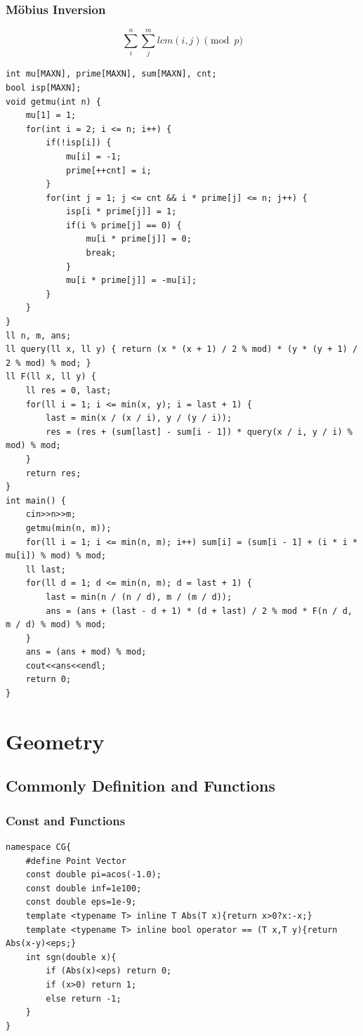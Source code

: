 \documentclass[10pt]{ctexart}
\begin{document}
{\subsubsection{Möbius Inversion}
$$
\sum_i^n \sum_j^m lcm(i,j)\pmod p
$$
\begin{lstlisting}
int mu[MAXN], prime[MAXN], sum[MAXN], cnt;
bool isp[MAXN];
void getmu(int n) {
    mu[1] = 1;
    for(int i = 2; i <= n; i++) {
        if(!isp[i]) {
            mu[i] = -1;
            prime[++cnt] = i;
        }
        for(int j = 1; j <= cnt && i * prime[j] <= n; j++) {
            isp[i * prime[j]] = 1;
            if(i % prime[j] == 0) {
                mu[i * prime[j]] = 0;
                break;
            }
            mu[i * prime[j]] = -mu[i];
        }
    }
}
ll n, m, ans;
ll query(ll x, ll y) { return (x * (x + 1) / 2 % mod) * (y * (y + 1) / 2 % mod) % mod; }
ll F(ll x, ll y) {
    ll res = 0, last;
    for(ll i = 1; i <= min(x, y); i = last + 1) {
        last = min(x / (x / i), y / (y / i));
        res = (res + (sum[last] - sum[i - 1]) * query(x / i, y / i) % mod) % mod;
    }
    return res;
}
int main() {
    cin>>n>>m;
    getmu(min(n, m));
    for(ll i = 1; i <= min(n, m); i++) sum[i] = (sum[i - 1] + (i * i * mu[i]) % mod) % mod;
    ll last;
    for(ll d = 1; d <= min(n, m); d = last + 1) {
        last = min(n / (n / d), m / (m / d));
        ans = (ans + (last - d + 1) * (d + last) / 2 % mod * F(n / d, m / d) % mod) % mod;
    }
    ans = (ans + mod) % mod;
    cout<<ans<<endl;
    return 0;
}
\end{lstlisting}





\newpage
\section{Geometry}
\subsection{Commonly Definition and Functions}
\subsubsection{Const and Functions}
\begin{lstlisting}
namespace CG{
    #define Point Vector
    const double pi=acos(-1.0);
    const double inf=1e100;
    const double eps=1e-9;
    template <typename T> inline T Abs(T x){return x>0?x:-x;}
    template <typename T> inline bool operator == (T x,T y){return Abs(x-y)<eps;}
    int sgn(double x){
        if (Abs(x)<eps) return 0;
        if (x>0) return 1;
        else return -1;
    }
}
\end{lstlisting}
}
\end{document}
